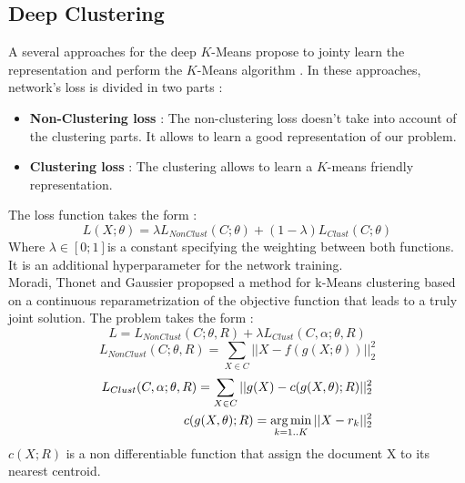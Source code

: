 \subsection{Deep Clustering}\label{seq:DeepClust}
A several approaches for the deep $K$-Means propose to jointy learn the
representation and perform the $K$-Means algorithm \cite{2018arXiv180107648A}.
In these approaches, network's loss is divided in two parts :
\begin{itemize}
\item \textbf{Non-Clustering loss} : The non-clustering loss doesn't
  take into account of the clustering parts. It allows to learn a good
  representation of our problem.
\item \textbf{Clustering loss} : The clustering allows to learn a
  $K$-means friendly representation.
\end{itemize}
The loss function takes the form :
\begin{equation}
L(X;\theta) = \lambda L_{NonClust}(C;\theta) + (1-\lambda)L_{Clust}(C; \theta)
\end{equation}
Where $\lambda \in [0 ; 1]$is a constant specifying the weighting between both 
functions.
It is an additional hyperparameter for the network training.\\
Moradi, Thonet and Gaussier \cite{Deap-K-Means} propopsed a method for k-Means 
clustering based on a continuous reparametrization of the objective function 
that leads to a truly joint solution. 
The problem takes the form : 
\begin{equation}
L = L_{NonClust}(C;\theta,R ) + \lambda L_{Clust}(C,\alpha;\theta,R)
\end{equation}
\begin{equation}
L_{NonClust}(C;\theta,R ) = \sum_{X \in C} ||X - f(g(X;\theta))||_2^2
\end{equation}
\begin{equation}
\begin{aligned}
L_{Clust}(C,\alpha;\theta,R) = \sum_{X \in C} ||g(X) - c(g(X, \theta); R) ||_2^2\\
c(g(X, \theta); R) = \operatorname*{arg\,min}_{k = 1 .. K} || X - r_k||_2^2
\end{aligned}
\end{equation}
$c(X ; R)$ is a non differentiable function that assign the document X to its nearest centroid.